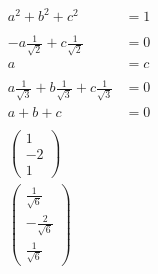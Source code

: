 \documentclass{article}
\begin{document}
\setcounter{subsubsection}{46}
\subsubsection{}

\begin{align*}
  a^2 + b^2 + c^2                                                    & = 1 \\ \\
  -a \frac{1}{\sqrt{2}} + c \frac{1}{\sqrt{2}}                       & = 0 \\
  a                                                                  & = c \\ \\
  a \frac{1}{\sqrt{3}} + b \frac{1}{\sqrt{3}} + c \frac{1}{\sqrt{3}} & = 0 \\
  a + b + c                                                          & = 0 \\ \\
  \begin{pmatrix}
    1  \\
    -2 \\
    1
  \end{pmatrix}                                                           \\
  \begin{pmatrix}
    \frac{1}{\sqrt{6}}  \\
    -\frac{2}{\sqrt{6}} \\
    \frac{1}{\sqrt{6}}
  \end{pmatrix}
\end{align*}

\setcounter{subsubsection}{56}
\subsubsection{}
\end{document}
